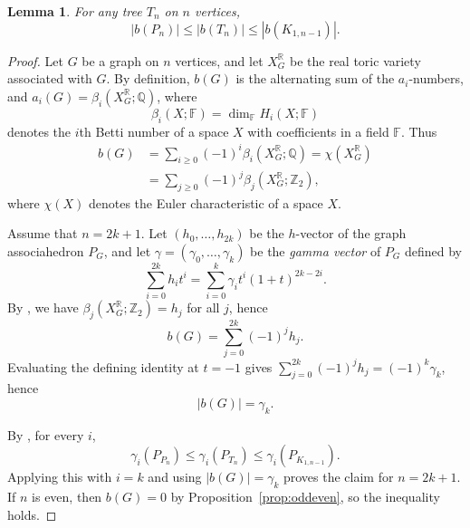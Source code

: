 \documentclass[10pt]{amsart}
\theoremstyle{plain}
\newtheorem{lemma}[theorem]{Lemma}
\numberwithin{equation}{section}
\theoremstyle{definition}
\newcommand{\Q}{\mathbb{Q}}
\newcommand{\F}{\mathbb{F}}
\newcommand{\R}{\mathbb{R}}
\newcommand{\Z}{\mathbb{Z}}
\begin{document}
\begin{lemma}\label{lem:bounds_b_tree_odd}
For any tree $T_{n}$ on $n$ vertices,
$$
    |b(P_{n})|\le |b(T_{n})|\le |b(K_{1,n-1})|.
$$
\end{lemma}
\begin{proof}
Let $G$ be a graph on $n$ vertices, and let $X_G^{\R}$ be the real toric variety associated with $G$.
By definition, $b(G)$ is the alternating sum of the $a_i$-numbers, and $a_i(G)=\beta_i(X_G^{\R};\Q)$, where
$$
    \beta_i(X;\F)=\dim_{\F} H_i(X;\F)
$$
denotes the $i$th Betti number of a space $X$ with coefficients in a field $\F$.
Thus
\begin{align*}
b(G) &=\sum_{i\ge 0}(-1)^i \beta_i(X_G^{\R};\Q)=\chi(X_G^{\R}) \\
     &=\sum_{j\ge 0}(-1)^j \beta_j(X_G^{\R};\Z_2),
\end{align*}
where $\chi(X)$ denotes the Euler characteristic of a space $X$.

Assume that $n=2k+1$.
Let $(h_0,\ldots,h_{2k})$ be the $h$-vector of the graph associahedron $P_G$, and let
$\gamma=(\gamma_0,\ldots,\gamma_k)$ be the \emph{gamma vector} of $P_G$ defined by
$$
    \sum_{i=0}^{2k} h_i t^i=\sum_{i=0}^{k}\gamma_i  t^i(1+t)^{2k-2i}.
$$
By \cite{Davis-Januszkiewicz1991}, we have $\beta_j(X_G^{\R};\Z_2)=h_j$ for all $j$, hence
$$
    b(G)=\sum_{j=0}^{2k}(-1)^j h_j.
$$
Evaluating the defining identity at $t=-1$ gives $\sum_{j=0}^{2k}(-1)^j h_j=(-1)^k\gamma_k$, hence
$$
    |b(G)|=\gamma_k.
$$

By \cite{Bukhshtaber-Volodin2011}, for every $i$,
$$
    \gamma_i(P_{P_n})\le \gamma_i(P_{T_n})\le \gamma_i(P_{K_{1,n-1}}).
$$
Applying this with $i=k$ and using $|b(G)|=\gamma_k$ proves the claim for $n=2k+1$.
If $n$ is even, then $b(G)=0$ by Proposition~\ref{prop:oddeven}, so the inequality holds.
\end{proof}
\end{document}
